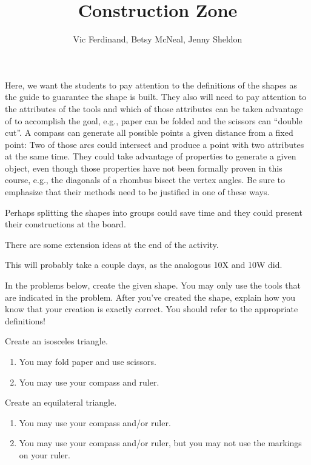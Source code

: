 \documentclass{ximera}
\title{Construction Zone}
\author{Vic Ferdinand, Betsy McNeal, Jenny Sheldon}
\begin{document}
\begin{abstract}
\end{abstract}
\maketitle

\begin{instructorIntro}
Here, we want the students to pay attention to the definitions of the shapes as the guide to guarantee the shape is built.  They also will need to pay attention to the attributes of the tools and which of those attributes can be taken advantage of to accomplish the goal, e.g., paper can be folded and the scissors can “double cut”.  A compass can generate all possible points a given distance from a fixed point:  Two of those arcs could intersect and produce a point with two attributes at the same time.   
     They could take advantage of properties to generate a given object, even though those properties have not been formally proven in this course, e.g., the diagonals of a rhombus bisect the vertex angles.  Be sure to emphasize that their methods need to be justified in one of these ways.
     
     Perhaps splitting the shapes into groups could save time and they could present their constructions at the board.
     
  There are some extension ideas at the end of the activity.
    
    This will probably take a couple days, as the analogous 10X and 10W did.
\end{instructorIntro}

In the problems below, create the given shape.  You may only use the tools that are indicated in the problem.  After you've created the shape, explain how you know that your creation is exactly correct.  You should refer to the appropriate definitions!

\begin{problem}
Create an isosceles triangle.
\begin{enumerate}
\item You may fold paper and use scissors.
\item You may use your compass and ruler.
\end{enumerate}
\end{problem}

\begin{problem}
Create an equilateral triangle.
\begin{enumerate}

\item You may use your compass and/or ruler.
\item You may use your compass and/or ruler, but you may not use the markings on your ruler.
\end{enumerate}
\end{problem}
\end{document}
